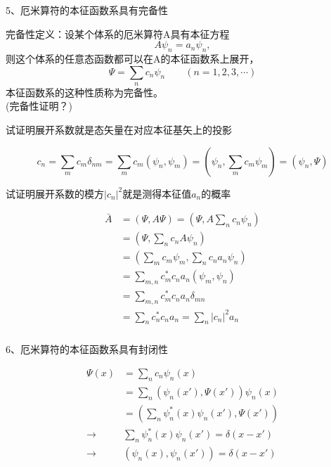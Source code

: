\begin{frame} [allowframebreaks=]
    \frametitle{}
    \begin{exampleblock}{}
        5、厄米算符的本征函数系具有完备性
    \end{exampleblock}
    \alert{完备性定义：}设某个体系的厄米算符A具有本征方程
    \begin{equation*}
        A\psi_{n}=a_n\psi_{n}, 
    \end{equation*}  
    则这个体系的任意态函数都可以在A的本征函数系上展开，
    \begin{equation*}
        \Psi=\sum_n c_n \psi_{n} \qquad (n=1,2,3,\cdots)
    \end{equation*}
    本征函数系的这种性质称为完备性。\\
    (完备性证明？)
    \begin{exampleblock}{}
        试证明展开系数就是态矢量在对应本征基矢上的投影
    \end{exampleblock}
    \begin{equation*}
        c_n=\sum_m c_m\delta_{nm} = \sum_m c_m(\psi_n, \psi_m)= (\psi_n, \sum_m c_m\psi_m) =(\psi_n, \Psi)
    \end{equation*}
    \begin{exampleblock}{}
        试证明展开系数的模方$|c_n|^2$就是测得本征值$a_n$的概率
    \end{exampleblock}
    \begin{equation*}
        \begin{split}
            \bar{A}&=(\Psi, A\Psi)=(\Psi, A\sum_n c_n \psi_{n})\\
            &=(\Psi, \sum_n c_n A\psi_{n})\\
            &=(\sum_m c_m \psi_{m}, \sum_n c_n a_n \psi_{n})\\
            &=\sum_{m,n} c_m^* c_n a_n (\psi_m, \psi_n)\\
            &=\sum_{m,n} c_m^* c_n a_n \delta_{mn}\\
            &=\sum_{n} c_n^* c_n a_n =\sum_{n} |c_n|^2 a_n 
        \end{split}
    \end{equation*}
\end{frame} 

\begin{frame} [allowframebreaks=]
    \frametitle{}
    \begin{exampleblock}{}
        6、厄米算符的本征函数系具有封闭性
    \end{exampleblock}
    \begin{equation*}
        \begin{split}
            \Psi(x)&=\sum_n c_n \psi_{n}(x) \\
            &=\sum_n (\psi_n(x'), \Psi(x')) \psi_{n}(x)\\
            &= (\sum_n\psi_{n} ^* (x)\psi_n(x'), \Psi(x')) \\
            \to &\sum_n\psi_{n} ^* (x)\psi_n(x')=\delta(x-x')\\
            \to &(\psi_{n}(x),\psi_n(x'))=\delta(x-x')
        \end{split} 
    \end{equation*}
\end{frame} 


